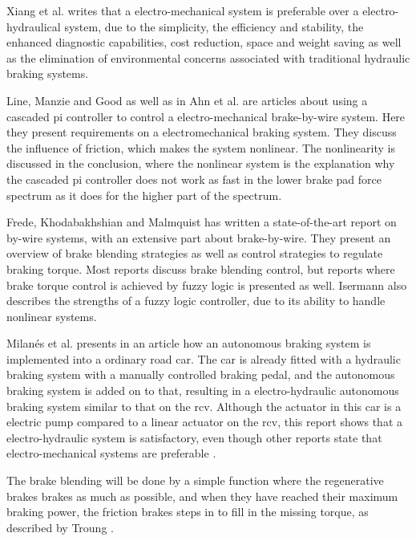 \documentclass[a4paper,11pt]{kth-mag}
\begin{document}
Xiang et al. \cite{Xiang} writes that a electro-mechanical system is preferable over a electro-hydraulical system, due to the simplicity, the efficiency and stability, the enhanced diagnostic capabilities, cost reduction, space and weight saving as well as the elimination of environmental concerns associated with traditional hydraulic braking systems.\newline

Line, Manzie and Good \cite{2004-01-2050} as well as in Ahn et al. \cite{ahn2009analysis} are articles about using a cascaded \gls{pi} controller to control a electro-mechanical brake-by-wire system. Here they present requirements on a electromechanical braking system. They discuss the influence of friction, which makes the system nonlinear. The nonlinearity is discussed in the conclusion, where the nonlinear system is the explanation why the cascaded pi controller does not work as fast in the lower brake pad force spectrum as it does for the higher part of the spectrum. \newline



Frede, Khodabakhshian and Malmquist \cite{Frede460614} has written a state-of-the-art report on by-wire systems, with an extensive part about brake-by-wire. They present an overview of brake blending strategies as well as control strategies to regulate braking torque. Most reports discuss brake blending control, but reports where  brake torque control is achieved by fuzzy logic is presented as well. Isermann \cite{661149} also describes the strengths of a fuzzy logic controller, due to its ability to handle nonlinear systems. \newline

Milan{\'e}s et al. \cite{milanes2010electro} presents in an article how an autonomous braking system is implemented into a ordinary road car. The car is already fitted with a hydraulic braking system with a manually controlled braking pedal, and the autonomous braking system is added on to that, resulting in a electro-hydraulic autonomous braking system similar to that on the \gls{rcv}. 
Although the actuator in this car is a electric pump compared to a linear actuator on the \gls{rcv}, this report shows that a electro-hydraulic system is satisfactory, even though other reports state that electro-mechanical systems are preferable \cite{MechatronicsBook} \cite{Xiang}. \newline

The brake blending will be done by a simple function where the regenerative brakes brakes as much as possible, and when they have reached their maximum braking power, the friction brakes steps in to fill in the missing torque, as described by Troung \cite{truongdevelopment}. \newline
\end{document}
